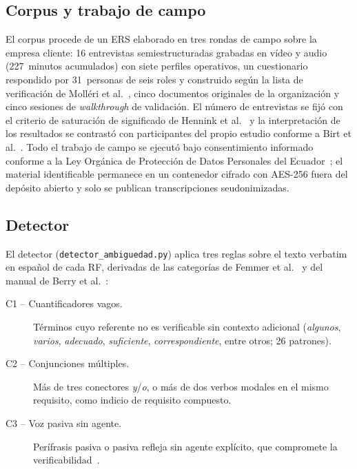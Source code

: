 \documentclass[runningheads]{llncs}
\begin{document}
\subsection{Corpus y trabajo de campo}

El corpus procede de un ERS elaborado en tres rondas de campo sobre la empresa
cliente: 16 entrevistas semiestructuradas grabadas en vídeo y audio
(227~minutos acumulados) con siete perfiles operativos, un cuestionario
respondido por 31~personas de seis roles y construido según la lista de
verificación de Molléri et al.~\cite{molleri2020checklist}, cinco documentos
originales de la organización y cinco sesiones de \textit{walkthrough} de
validación. El número de entrevistas se fijó con el criterio de saturación de
significado de Hennink et al.~\cite{hennink2017saturation} y la interpretación
de los resultados se contrastó con participantes del propio estudio conforme a
Birt et al.~\cite{birt2016member}. Todo el
trabajo de campo se ejecutó bajo consentimiento informado conforme a la Ley
Orgánica de Protección de Datos Personales del Ecuador~\cite{lopd2021}; el
material identificable permanece en un contenedor cifrado con AES-256 fuera del
depósito abierto y solo se publican transcripciones seudonimizadas.

\subsection{Detector}

El detector (\texttt{detector\_ambiguedad.py}) aplica tres reglas sobre el texto
verbatim en español de cada RF, derivadas de las categorías de Femmer et
al.~\cite{femmer2017smells} y del manual de Berry et
al.~\cite{berry2003ambiguity}:

\begin{description}
\item[C1 -- Cuantificadores vagos.] Términos cuyo referente no es verificable
sin contexto adicional (\textit{algunos}, \textit{varios}, \textit{adecuado},
\textit{suficiente}, \textit{correspondiente}, entre otros; 26 patrones).
\item[C2 -- Conjunciones múltiples.] Más de tres conectores
\textit{y}/\textit{o}, o más de dos verbos modales en el mismo requisito, como
indicio de requisito compuesto.
\item[C3 -- Voz pasiva sin agente.] Perífrasis pasiva o pasiva refleja sin
agente explícito, que compromete la verificabilidad~\cite{iso29148}.
\end{description}
\end{document}
